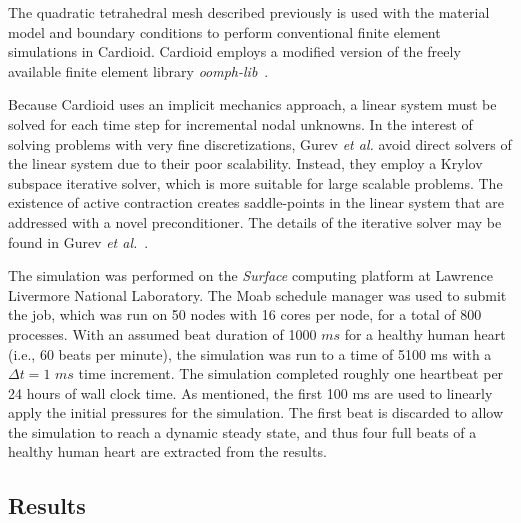 The quadratic tetrahedral mesh described previously is used with the material model and boundary conditions to perform conventional finite element simulations in Cardioid. Cardioid employs a modified version of the freely available finite element library \textit{oomph-lib}~\cite{oomph}.

Because Cardioid uses an implicit mechanics approach, a linear system must be solved for each time step for incremental nodal unknowns. In the interest of solving problems with very fine discretizations, Gurev \textit{et al.} avoid direct solvers of the linear system due to their poor scalability. Instead, they employ a Krylov subspace iterative solver, which is more suitable for large scalable problems. The existence of active contraction creates saddle-points in the linear system that are addressed with a novel preconditioner. The details of the iterative solver may be found in Gurev \textit{et al.}~\cite{gurev_2015}.

The simulation was performed on the \textit{Surface} computing platform at Lawrence Livermore National Laboratory. The Moab schedule manager was used to submit the job, which was run on 50 nodes with 16 cores per node, for a total of 800 processes. With an assumed beat duration of 1000 $ms$ for a healthy human heart (i.e., 60 beats per minute), the simulation was run to a time of 5100 ms with a $\Delta t = 1$ $ms$ time increment. The simulation completed roughly one heartbeat per 24 hours of wall clock time. As mentioned, the first 100 ms are used to linearly apply the initial pressures for the simulation. The first beat is discarded to allow the simulation to reach a dynamic steady state, and thus four full beats of a healthy human heart are extracted from the results.

\subsection{Results}
\label{Results}


